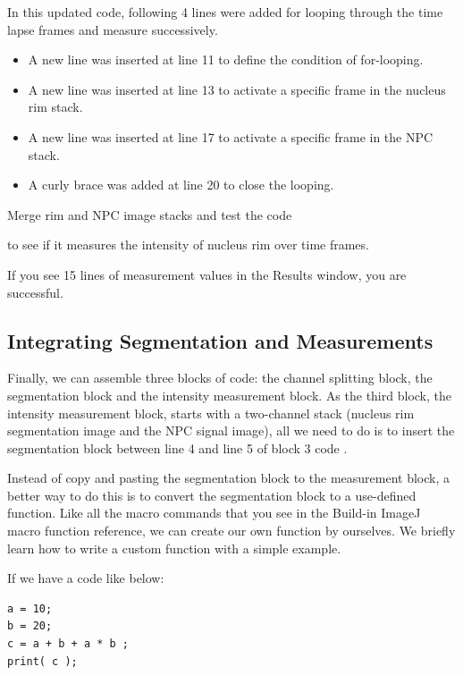 In this updated code, following 4 lines were added for looping through the time lapse frames and measure successively. 
\begin{itemize}
    \item A new line was inserted at line 11 to define the condition of for-looping.
    \item A new line was inserted at line 13 to activate a specific frame in the nucleus rim stack.
    \item A new line was inserted at line 17 to activate a specific frame in the NPC stack.
    \item A curly brace was added at line 20 to close the looping.
\end{itemize}

\begin{indentexercise}{4}
Merge rim and NPC image stacks and test the code 


to see if it measures the intensity of nucleus rim over time frames. 

If you see 15 lines of measurement values in the Results window, you are successful. 
\end{indentexercise}

\subsection{Integrating Segmentation and Measurements}

Finally, we can assemble three blocks of code: the channel splitting block, the segmentation block and the intensity measurement block. As the third block, the intensity measurement block, starts with a two-channel stack (nucleus rim segmentation image and the NPC signal image), all we need to do is to insert the segmentation block between line 4 and line 5 of block 3 code . 

Instead of copy and pasting the segmentation block to the measurement block, a better way to do this is to convert the segmentation block to a use-defined function. Like all the macro commands that you see in the Build-in ImageJ macro function reference, we can create our own function by ourselves. We briefly learn how to write a custom function with a simple example. 

If we have a code like below:

\begin{lstlisting}
a = 10;
b = 20;
c = a + b + a * b ;
print( c );
\end{lstlisting}

